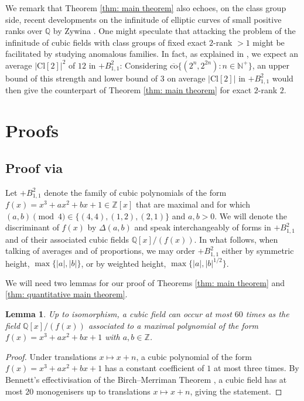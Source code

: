 \documentclass[a4paper, 12pt]{amsart}
\newtheorem{lemma}{Lemma}
\newcommand{\Cl}{\mathrm{Cl}}
\begin{document}
We remark that Theorem \ref{thm: main theorem} also echoes, on the class group side, recent developments on the infinitude of elliptic curves of small positive ranks over $\mathbb{Q}$ by Zywina \cite{2502.01957}.
One might speculate that attacking the problem of the infinitude of cubic fields with class groups of fixed exact $2$-rank $>1$ might be facilitated by studying anomalous families. In fact, as explained in \cite{ShankarSiadSwaminathanNumericsandConjecturesUnitMonogenized}, we expect an average $\lvert \Cl[2] \rvert^2$ of $12$ in $+B_{1,1}^2$: Considering $\overline{\mathrm{co}}\{(2^n,2^{2n}) \colon n \in \mathbb{N}^+\}$, an upper bound of this strength and lower bound of $3$ on average $\lvert \Cl[2]\rvert$ in $+B_{1,1}^2$ would then give the counterpart of Theorem \ref{thm: main theorem} for exact $2$-rank $2$.

\section{Proofs} \label{sec: proof}

\subsection{Proof via \cite{MR4891959}} 
\label{sec: proof SSS}

Let $+B_{1,1}^2$ denote the family of cubic polynomials of the form $f(x) = x^3+ax^2+bx+1 \in \mathbb{Z}[x]$ that are maximal and for which $(a,b) \pmod{4} \in \{(4,4),(1,2),(2,1)\}$ and $a,b >0$.  
We will denote the discriminant of $f(x)$ by $\Delta(a,b)$ and speak interchangeably of forms in $+B_{1,1}^2$ and of their associated cubic fields $\mathbb{Q}[x]/(f(x))$. In what follows, when talking of averages and of proportions, we may order $+B_{1,1}^2$ either by symmetric height, $\max \{ \lvert a \rvert, \lvert b \rvert \}$, or by weighted height, $\max \{ \lvert a \rvert, \lvert b \rvert^{1/2} \}$.


We will need two lemmas for our proof of Theorems \ref{thm: main theorem} and \ref{thm: quantitative main theorem}.

\begin{lemma} \label{lem: finite repetition}
    Up to isomorphism, a cubic field can occur at most $60$ times as the field $\mathbb{Q}[x]/(f(x))$ associated to a maximal polynomial of the form $f(x) = x^3+ax^2+bx+1$ with $a,b \in \mathbb{Z}$. 
\end{lemma}
\begin{proof}
    Under translations $x \mapsto x + n$, a cubic polynomial of the form $f(x) = x^3+ax^2+bx+1$ has a constant coefficient of $1$ at most three times. By Bennett's effectivisation \cite{Ben2001}\cite[Theorem A.1]{2409.02627} of the Birch--Merriman Theorem \cite{MR0306119}, a cubic field has at most $20$ monogenisers up to translations $x \mapsto x + n$, giving the statement. 
\end{proof}
\end{document}
